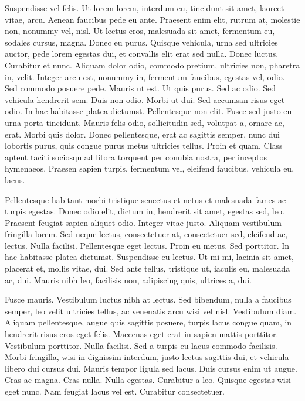 Suspendisse vel felis. Ut lorem lorem, interdum eu, tincidunt sit amet, laoreet vitae, arcu.
Aenean faucibus pede eu ante. Praesent enim elit, rutrum at, molestie non, nonummy vel, nisl. Ut lectus eros, malesuada sit amet, fermentum eu, sodales cursus, magna. Donec eu purus. Quisque vehicula, urna sed ultricies auctor, pede lorem egestas dui, et convallis elit erat sed nulla. Donec luctus. Curabitur et nunc. Aliquam dolor odio, commodo pretium, ultricies non, pharetra in, velit. Integer arcu est, nonummy in, fermentum faucibus, egestas vel, odio.
Sed commodo posuere pede. Mauris ut est. Ut quis purus. Sed ac odio. Sed vehicula
hendrerit sem. Duis non odio. Morbi ut dui. Sed accumsan risus eget odio. In hac habitasse
platea dictumst. Pellentesque non elit. Fusce sed justo eu urna porta tincidunt. Mauris felis odio, sollicitudin sed, volutpat a, ornare ac, erat. Morbi quis dolor. Donec pellentesque, erat ac sagittis semper, nunc dui lobortis purus, quis congue purus metus ultricies tellus. Proin et quam. Class aptent taciti sociosqu ad litora torquent per conubia nostra, per inceptos hymenaeos. Praesen sapien turpis, fermentum vel, eleifend faucibus, vehicula eu, lacus.

Pellentesque habitant morbi tristique senectus et netus et malesuada fames ac turpis egestas.
Donec odio elit, dictum in, hendrerit sit amet, egestas sed, leo. Praesent feugiat sapien aliquet odio. Integer vitae justo. Aliquam vestibulum fringilla lorem. Sed neque lectus, consectetuer at, consectetuer sed, eleifend ac, lectus. Nulla facilisi. Pellentesque eget lectus. Proin eu metus. Sed porttitor. In hac habitasse platea dictumst. Suspendisse eu lectus. Ut mi mi, lacinia sit amet, placerat et, mollis vitae, dui. Sed ante tellus, tristique ut, iaculis eu, malesuada ac, dui. Mauris nibh leo, facilisis non, adipiscing quis, ultrices a, dui.

Fusce mauris. Vestibulum luctus nibh at lectus. Sed bibendum, nulla a faucibus semper, leo velit
ultricies tellus, ac venenatis arcu wisi vel nisl. Vestibulum diam. Aliquam pellentesque, augue
quis sagittis posuere, turpis lacus congue quam, in hendrerit risus eros eget felis. Maecenas eget
erat in sapien mattis porttitor. Vestibulum porttitor. Nulla facilisi. Sed a turpis eu lacus commodo
facilisis. Morbi fringilla, wisi in dignissim interdum, justo lectus sagittis dui, et vehicula libero
dui cursus dui. Mauris tempor ligula sed lacus. Duis cursus enim ut augue. Cras ac magna. Cras
nulla. Nulla egestas. Curabitur a leo. Quisque egestas wisi eget nunc. Nam feugiat lacus vel est.
Curabitur consectetuer.

